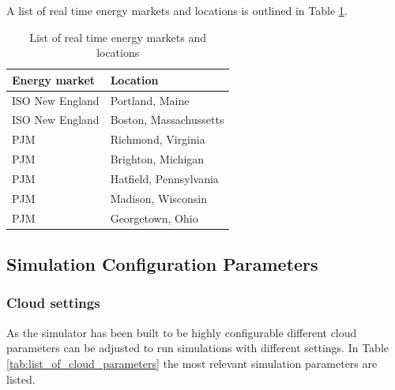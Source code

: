 A list of real time energy markets and locations is outlined in Table \ref{tab:list_of_real_time_markets}. 

\begin{table}[htbp]
\centering
\begin{tabular}{ll}
\toprule
 Energy market & Location \\
\midrule
	ISO New England &  Portland, Maine \\
	ISO New England &  Boston, Massachussetts \\
	PJM & Richmond, Virginia  \\
	PJM & Brighton, Michigan  \\
	PJM & Hatfield, Pennsylvania  \\
	PJM & Madison, Wisconsin  \\
	PJM & Georgetown, Ohio  \\
\bottomrule
\end{tabular}
\caption{List of real time energy markets and locations}
\label{tab:list_of_real_time_markets}
\end{table}





\subsection{Simulation Configuration Parameters} \label{ssec:simulation_configuration_parameters}

\subsubsection{Cloud settings}

As the simulator has been built to be highly configurable \cite{lucanin2015philharmonic} different cloud parameters can be adjusted to run simulations with different settings. In Table \ref{tab:list_of_cloud_parameters} the most relevant simulation parameters are listed. 

